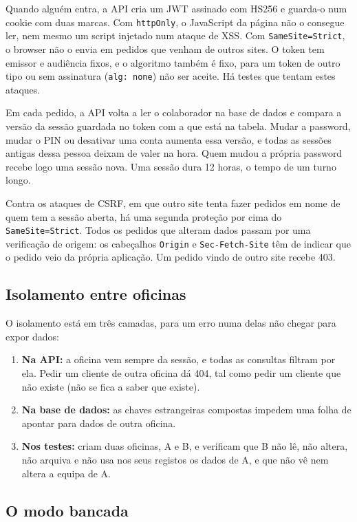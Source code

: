 \documentclass[a4paper,12pt]{article}
\begin{document}
Quando alguém entra, a \ac{API} cria um \ac{JWT} assinado com HS256 e guarda-o num cookie com duas marcas. Com \texttt{httpOnly}, o JavaScript da página não o consegue ler, nem mesmo um script injetado num ataque de \ac{XSS}. Com \texttt{SameSite=Strict}, o browser não o envia em pedidos que venham de outros sites. O token tem emissor e audiência fixos, e o algoritmo também é fixo, para um token de outro tipo ou sem assinatura (\texttt{alg: none}) não ser aceite. Há testes que tentam estes ataques.

Em cada pedido, a \ac{API} volta a ler o colaborador na base de dados e compara a versão da sessão guardada no token com a que está na tabela. Mudar a password, mudar o PIN ou desativar uma conta aumenta essa versão, e todas as sessões antigas dessa pessoa deixam de valer na hora. Quem mudou a própria password recebe logo uma sessão nova. Uma sessão dura 12 horas, o tempo de um turno longo.

Contra os ataques de \ac{CSRF}, em que outro site tenta fazer pedidos em nome de quem tem a sessão aberta, há uma segunda proteção por cima do \texttt{SameSite=Strict}. Todos os pedidos que alteram dados passam por uma verificação de origem: os cabeçalhos \texttt{Origin} e \texttt{Sec-Fetch-Site} têm de indicar que o pedido veio da própria aplicação. Um pedido vindo de outro site recebe 403.

\subsection{Isolamento entre oficinas}
\label{sec:isolamento}

O isolamento está em três camadas, para um erro numa delas não chegar para expor dados:
\begin{enumerate}
    \item \textbf{Na \ac{API}:} a oficina vem sempre da sessão, e todas as consultas filtram por ela. Pedir um cliente de outra oficina dá 404, tal como pedir um cliente que não existe (não se fica a saber que existe).
    \item \textbf{Na base de dados:} as chaves estrangeiras compostas impedem uma folha de apontar para dados de outra oficina.
    \item \textbf{Nos testes:} criam duas oficinas, A e B, e verificam que B não lê, não altera, não arquiva e não usa nos seus registos os dados de A, e que não vê nem altera a equipa de A.
\end{enumerate}

\subsection{O modo bancada}
\end{document}
